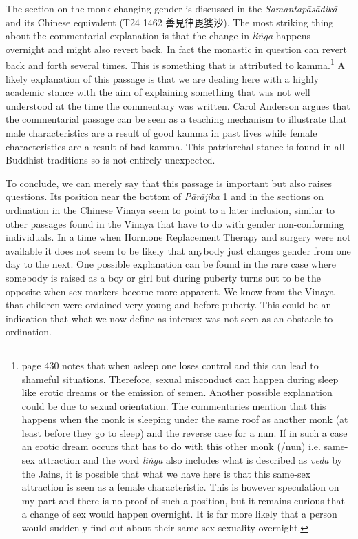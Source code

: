 The section on the monk changing gender is discussed in the {\em Samantapāsādikā} and its Chinese equivalent (T24 1462 善見律毘婆沙). The most striking thing about the commentarial explanation is that the change in {\em liṅga} happens overnight and might also revert back. In fact the monastic in question can revert back and forth several times. This is something that is attributed to kamma.\footnote{\cite{heirman} page 430 notes that when asleep one loses control and this can lead to shameful situations. Therefore, sexual misconduct can happen during sleep like erotic dreams or the emission of semen. Another possible explanation could be due to sexual orientation. The commentaries mention that this happens when the monk is sleeping under the same roof as another monk (at least before they go to sleep) and the reverse case for a nun. If in such a case an erotic dream occurs that has to do with this other monk (/nun) i.e. same-sex attraction and the word {\em liṅga} also includes what is described as {\em veda} by the Jains, it is possible that what we have here is that this same-sex attraction is seen as a female characteristic. This is however speculation on my part and there is no proof of such a position, but it remains curious that a change of sex would happen overnight. It is far more likely that a person would suddenly find out about their same-sex sexuality overnight.} A likely explanation of this passage is that we are dealing here with a highly academic stance with the aim of explaining something that was not well understood at the time the commentary was written. Carol Anderson argues that the commentarial passage can be seen as a teaching mechanism to illustrate that male characteristics are a result of good kamma in past lives while female characteristics are a result of bad kamma. This patriarchal stance is found in all Buddhist traditions so is not entirely unexpected. 

To conclude, we can merely say that this passage is important but also raises questions. Its position near the bottom of {\em Pārājika} 1 and in the sections on ordination in the Chinese Vinaya seem to point to a later inclusion, similar to other passages found in the Vinaya that have to do with gender non-conforming individuals. In a time when Hormone Replacement Therapy and surgery were not available it does not seem to be likely that anybody just changes gender from one day to the next. One possible explanation can be found in the rare case where somebody is raised as a boy or girl but during puberty turns out to be the opposite when sex markers become more apparent. We know from the Vinaya that children were ordained very young and before puberty. This could be an indication that what we now define as intersex was not seen as an obstacle to ordination.

